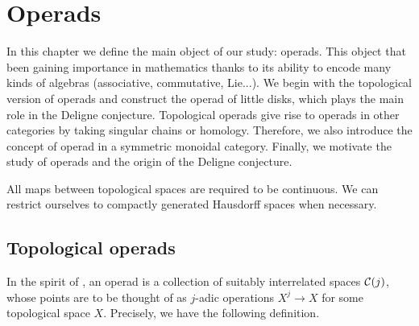 \documentclass[TFM.tex]{subfiles}
\begin{document}
\chapter{Operads}\label{3}


In this chapter we define the main object of our study: operads. This object that been gaining importance in mathematics thanks to its ability to encode many kinds of algebras (associative, commutative, Lie...). We begin with the topological version of operads and construct the operad of little disks, which plays the main role in the Deligne conjecture. Topological operads give rise to operads in other categories by taking singular chains or homology. Therefore, we also introduce the concept of operad in a symmetric monoidal category. Finally, we motivate the study of operads and the origin of the Deligne conjecture. 

All maps between topological spaces are required to be continuous. We can restrict ourselves to compactly generated Hausdorff spaces when necessary. 




\section{Topological operads}
%
In the spirit of \cite{May}, an operad is a collection of suitably interrelated spaces $\mathcal{C}(j)$, whose points are to
be thought of as $j$-adic operations $X^j \to X$ for some topological space $X$. Precisely, we have the following definition.
\end{document}
